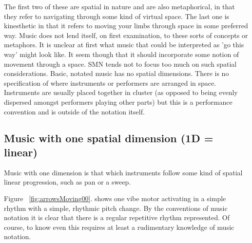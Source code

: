 \documentclass[a4paper, twocolumn]{article}
\begin{document}
The first two of these are spatial in nature and are also metaphorical, in that they refer to navigating through some kind of virtual space. The last one is kinesthetic in that it refers to moving your limbs through space in some preferred way. Music does not lend itself, on first examination, to these sorts of concepts or metaphors. It is unclear at first what music that could be interpreted as 'go this way' might look like. It seem though that it should incorporate some notion of movement through a space. SMN tends not to focus too much on such spatial considerations. Basic, notated music has no spatial dimensions. There is no specification of where instruments or performers are arranged in space. Instruments are usually placed together in cluster (as opposed to being evenly dispersed amongst performers playing other parts) but this is a performance convention and is outside of the notation itself.\\

\subsection{Music with one spatial dimension (1D = linear)}
Music with one dimension is that which instruments follow some kind of spatial linear progression, such as pan or a sweep. 

Figure ~\ref{fig:arrowsMoving00}. shows one vibe motor activating in a simple rhythm with a simple, rhythmic pitch change. By the conventions of music notation it is clear that there is a regular repetitive rhythm represented. Of course, to know even this requires at least a rudimentary knowledge of music notation. 



\end{document}
